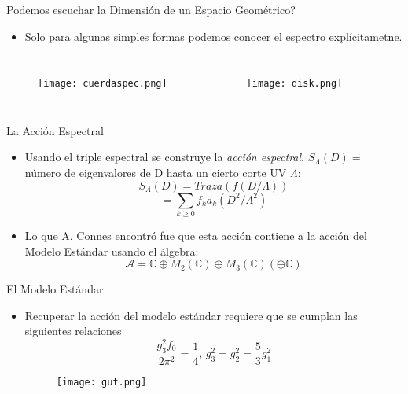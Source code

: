 \documentclass{beamer}
\begin{document}
\begin{frame}{Podemos escuchar la Dimensión de un Espacio Geométrico?}


\begin{itemize}

\item Solo para algunas simples formas podemos conocer el espectro explícitametne. 
\end{itemize}
\begin{columns}

\begin{figure}
\texttt{[image: cuerdaspec.png]}
\end{figure}


\begin{figure}
\texttt{[image: disk.png]}
\end{figure}

\end{columns}
\end{frame}




\begin{frame}{La Acción Espectral}

\begin{itemize}
\item Usando el triple espectral se construye la \textit{acción espectral}. $S_{\Lambda}(D) =$ número de eigenvalores de D hasta un cierto corte UV $\Lambda$:
\[
S_{\Lambda}(D) = Traza(f (D/ \Lambda )) 
\]
\[
= \sum_{k \geq 0} f_k a_k(D^2 / \Lambda^2)
\]
\vspace{5mm}
\item Lo que A. Connes encontró fue que esta acción contiene a la acción del Modelo Estándar usando el álgebra:
 \[
\mathcal{A} = \mathbb{C} \oplus M_2 (\mathbb{C}) \oplus M_3 (\mathbb{C}) (\oplus \mathbb{C})
\]

\end{itemize}
\end{frame}



\begin{frame}{El Modelo Estándar}

\begin{itemize}
\item Recuperar la acción del modelo estándar requiere que se cumplan las siguientes relaciones
\[ \frac{g_{3}^{2} f_0}{2 \pi^2} = \frac{1}{4}, \, g_{3}^{2} = g_{2}^{2} = \frac{5}{3} g_{1}^{2} 
\] 
\begin{figure}
\texttt{[image: gut.png]}
\end{figure}

\end{itemize}
\end{frame}
\end{document}
